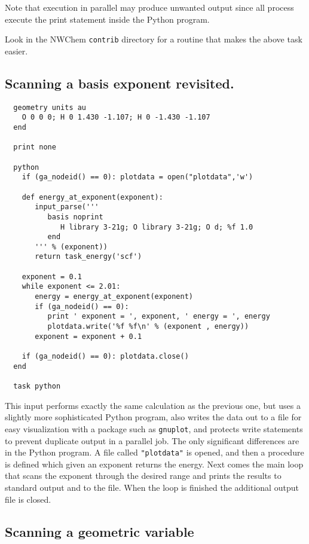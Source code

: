 Note that execution in parallel may produce unwanted output since
all process execute the print statement inside the Python program.

Look in the NWChem \verb+contrib+ directory for a routine that makes
the above task easier.

\subsection{Scanning a basis exponent revisited.}
\label{sec:scan2}

\begin{verbatim}
  geometry units au
    O 0 0 0; H 0 1.430 -1.107; H 0 -1.430 -1.107
  end

  print none

  python
    if (ga_nodeid() == 0): plotdata = open("plotdata",'w')

    def energy_at_exponent(exponent):
       input_parse('''
          basis noprint
             H library 3-21g; O library 3-21g; O d; %f 1.0
          end
       ''' % (exponent))
       return task_energy('scf')

    exponent = 0.1
    while exponent <= 2.01:
       energy = energy_at_exponent(exponent)
       if (ga_nodeid() == 0):
          print ' exponent = ', exponent, ' energy = ', energy
          plotdata.write('%f %f\n' % (exponent , energy))
       exponent = exponent + 0.1

    if (ga_nodeid() == 0): plotdata.close()
  end

  task python
\end{verbatim}

This input performs exactly the same calculation as the previous one,
but uses a slightly more sophisticated Python program, also writes
the data out to a file for easy visualization with a package such as
\verb+gnuplot+, and protects write statements to prevent 
duplicate output in a parallel job.  The only significant differences
are in the Python program.  A file called \verb+"plotdata"+ is opened,
and then a procedure is defined which given an exponent returns the
energy.  Next comes the main loop that scans the exponent through the
desired range and prints the results to standard output and to the
file.  When the loop is finished the additional output file is closed.

\subsection{Scanning a geometric variable}

